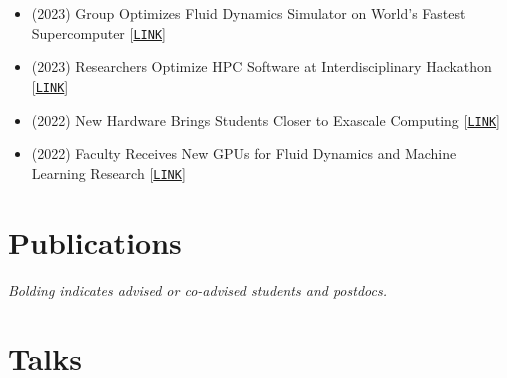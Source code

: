 \begin{itemize}
    \item (2023) Group Optimizes Fluid Dynamics Simulator on World's Fastest Supercomputer [\href{https://www.cc.gatech.edu/news/group-optimizes-fluid-dynamics-simulator-worlds-fastest-supercomputer}{\tt LINK}]

    \item (2023) Researchers Optimize HPC Software at Interdisciplinary Hackathon
[\href{https://www.cc.gatech.edu/news/researchers-optimize-hpc-software-interdisciplinary-hackathon}{\tt LINK}]

    \item (2022) New Hardware Brings Students Closer to Exascale Computing [\href{https://www.cc.gatech.edu/news/new-hardware-brings-students-closer-exascale-computing}{\tt LINK}]

    \item (2022) Faculty Receives New GPUs for Fluid Dynamics and Machine Learning Research [\href{https://www.cc.gatech.edu/news/faculty-receives-new-gpus-fluid-dynamics-and-machine-learning-research}{\tt LINK}]
\end{itemize}

\section{Publications}

\begin{center}
    \textit{Bolding indicates advised or co-advised students and postdocs.}
\end{center}

\nocite{*}

\newrefcontext[labelprefix=PP]
\printbibliography[type=unpublished,title={Preprints},resetnumbers=true,heading=subbibnumbered]

\newrefcontext[labelprefix=P]
\printbibliography[title={Archival, heavily refereed papers},resetnumbers=true,filter=fullpapers,heading=subbibnumbered]

\newrefcontext[labelprefix=C]
\printbibliography[title={Conference papers},resetnumbers=true,filter=nonheavy,heading=subbibnumbered]

\newrefcontext[labelprefix=O]
\printbibliography[title={Other published content},resetnumbers=true,filter=other,heading=subbibnumbered]

\section{Talks}

